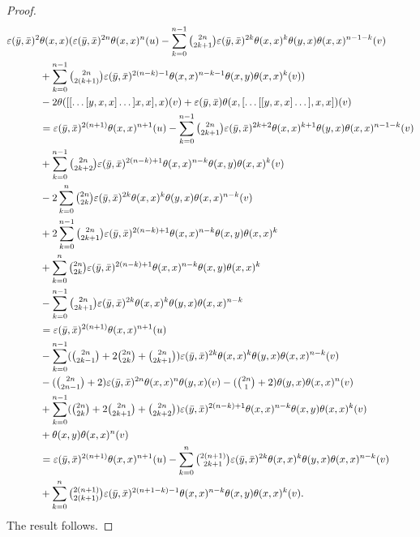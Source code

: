 \documentclass[11pt, twoside]{article}
\begin{document}
\begin{proof}
\begin{align*}
        \varepsilon(\bar{y},\bar{x})^2&\theta(x,x)(\varepsilon(\bar{y},\bar{x})^{2n}\theta(x,x)^n(u)- \sum\limits_{k=0}^{n-1}\tbinom{2n}{2k+1}\varepsilon(\bar{y},\bar{x})^{2k}\theta(x,x)^k\theta(y,x)\theta(x,x)^{n-1-k}(v)  \\ & +\sum\limits_{k=0}^{n-1}\tbinom{2n}{2(k+1)}\varepsilon(\bar{y},\bar{x})^{2(n-k)-1}\theta(x,x)^{n-k-1}\theta(x,y)\theta(x,x)^k(v)) \\& -2\theta([[\dots[y,x,x]\dots]x,x],x)(v) +\varepsilon(\bar{y},\bar{x})\theta(x,[\dots[[y,x,x]\dots],x,x])(v)\\ & = \varepsilon(\bar{y},\bar{x})^{2(n+1)}\theta(x,x)^{n+1}(u)  - \sum\limits_{k=0}^{n-1}\tbinom{2n}{2k+1}\varepsilon(\bar{y},\bar{x})^{2k+2}\theta(x,x)^{k+1}\theta(y,x)\theta(x,x)^{n-1-k}(v) \\& +  \sum\limits_{k=0}^{n-1}\tbinom{2n}{2k+2}\varepsilon(\bar{y},\bar{x})^{2(n-k)+1}\theta(x,x)^{n-k}\theta(x,y)\theta(x,x)^k(v) \\ & -2 \sum\limits_{k=0}^n\tbinom{2n}{2k}\varepsilon(\bar{y},\bar{x})^{2k}\theta(x,x)^k\theta(y,x)\theta(x,x)^{n-k}(v) \\ & + 2\sum\limits_{k=0}^{n-1}\tbinom{2n}{2k+1}\varepsilon(\bar{y},\bar{x})^{2(n-k)+1}\theta(x,x)^{n-k}\theta(x,y)\theta(x,x)^k \\ & + \sum\limits_{k=0}^n\tbinom{2n}{2k}\varepsilon(\bar{y},\bar{x})^{2(n-k)+1}\theta(x,x)^{n-k}\theta(x,y)\theta(x,x)^k \\ & - \sum\limits_{k=0}^{n-1}\tbinom{2n}{2k+1}\varepsilon(\bar{y},\bar{x})^{2k}\theta(x,x)^k\theta(y,x)\theta(x,x)^{n-k} \\ & = \varepsilon(\bar{y},\bar{x})^{2(n+1)}\theta(x,x)^{n+1}(u) \\ & -\sum\limits_{k=0}^{n-1}(\tbinom{2n}{2k-1}+ 2\tbinom{2n}{2k}+ \tbinom{2n}{2k+1})\varepsilon(\bar{y},\bar{x})^{2k}\theta(x,x)^k\theta(y,x)\theta(x,x)^{n-k}(v) \\ & - (\tbinom{2n}{2n-1}+2)\varepsilon(\bar{y},\bar{x})^{2n}\theta(x,x)^n\theta(y,x)(v) - (\tbinom{2n}{1}+2)\theta(y,x)\theta(x,x)^n(v) \\ & +\sum\limits_{k=0}^{n-1}(\tbinom{2n}{2k}+ 2\tbinom{2n}{2k+1}+ \tbinom{2n}{2k+2})\varepsilon(\bar{y},\bar{x})^{2(n-k)+1}\theta(x,x)^{n-k}\theta(x,y)\theta(x,x)^k(v)\\ & + \theta(x,y)\theta(x,x)^n(v) \\ & = \varepsilon(\bar{y},\bar{x})^{2(n+1)}\theta(x,x)^{n+1}(u)- \sum\limits_{k=0}^{n}\tbinom{2(n+1)}{2k+1}\varepsilon(\bar{y},\bar{x})^{2k}\theta(x,x)^k\theta(y,x)\theta(x,x)^{n-k}(v)  \\ &+ \sum\limits_{k=0}^{n}\tbinom{2(n+1)}{2(k+1)}\varepsilon(\bar{y},\bar{x})^{2(n+1-k)-1}\theta(x,x)^{n-k}\theta(x,y)\theta(x,x)^k(v).
   \end{align*} The result follows.
\end{proof}
\end{document}
